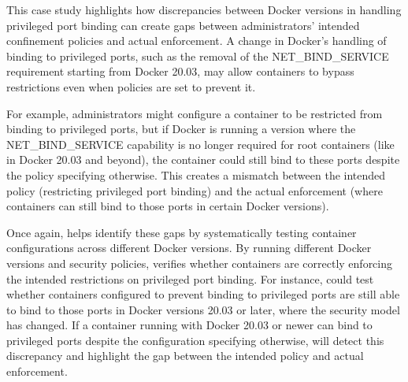 {This case study highlights how discrepancies between Docker versions in handling privileged port binding can create gaps between administrators' intended confinement policies and actual enforcement. A change in Docker's handling of binding to privileged ports, such as the removal of the NET\_BIND\_SERVICE requirement starting from Docker 20.03, may allow containers to bypass restrictions even when policies are set to prevent it. 

For example, administrators might configure a container to be restricted from binding to privileged ports, but if Docker is running a version where the NET\_BIND\_SERVICE capability is no longer required for root containers (like in Docker 20.03 and beyond), the container could still bind to these ports despite the policy specifying otherwise. This creates a mismatch between the intended policy (restricting privileged port binding) and the actual enforcement (where containers can still bind to those ports in certain Docker versions).

Once again, \houdini helps identify these gaps by systematically testing container configurations across different Docker versions. By running different Docker versions and security policies, \houdini verifies whether containers are correctly enforcing the intended restrictions on privileged port binding. For instance, \houdini could test whether containers configured to prevent binding to privileged ports are still able to bind to those ports in Docker versions 20.03 or later, where the security model has changed. If a container running with Docker 20.03 or newer can bind to privileged ports despite the configuration specifying otherwise, \houdini will detect this discrepancy and highlight the gap between the intended policy and actual enforcement.



}
